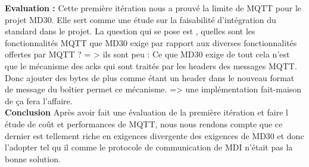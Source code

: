     \textbf{Evaluation :}
    Cette première itération nous a prouvé la limite de MQTT pour le projet MD30. Elle sert comme une étude 
    sur la faisabilité d'intégration du standard dans le projet.
    La question qui se pose est , quelles sont les fonctionnalités MQTT que MD30 exige par rapport aux 
    diverses fonctionnalités offertes par MQTT ? = > ils sont peu : 
    Ce que MD30 exige de tout cela n’est que le mécanisme des acks qui sont traités par les headers des messages MQTT. 
    Donc ajouter des bytes de plus comme étant un header dans le nouveau format de message du boîtier permet ce mécanisme. 
    => une implémentation fait-maison de ça fera l'affaire. \\




    \textbf{Conclusion} \break
            Après avoir fait une évaluation de la première itération et faire l étude de coût et performances de MQTT, 
        nous nous rendons compte que ce dernier est tellement riche en exigences divergente des exigences de MD30 et 
        donc l'adopter tel qu il comme le protocole de communication de MDI n’était pas la bonne solution. 


    



  

